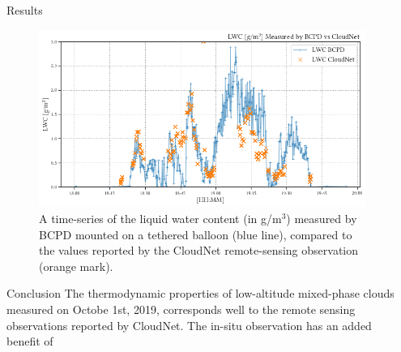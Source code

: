 \documentclass[final]{beamer}
\newlength{\sepwidth}
\newlength{\colwidth}
\newcommand{\separatorcolumn}{\begin{column}{\sepwidth}\end{column}}
\begin{document}
\begin{frame}[t]
\begin{columns}[t]
\begin{column}{\colwidth}
\begin{block}{Results}
        \begin{figure}
          \centering
          \includegraphics[width=\colwidth]{figure/ts_lwc.png}
          \caption{A time-series of the liquid water content (in g/m$^3$) measured by BCPD mounted on a tethered balloon (blue line), compared to the values reported by the CloudNet remote-sensing observation (orange mark).}
        \end{figure}

      \end{block}

      \begin{block}{Conclusion}
        The thermodynamic properties of low-altitude mixed-phase clouds measured on Octobe 1st, 2019, corresponds well to the remote sensing observations reported by CloudNet. The in-situ observation has an added benefit of 
      \end{block}

    \end{column}

    \separatorcolumn
  \end{columns}

\end{frame}
\end{document}
